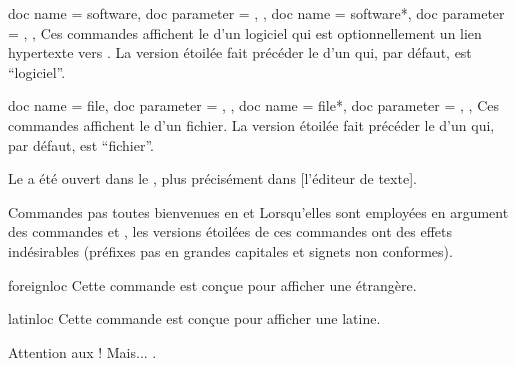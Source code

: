 \documentclass{letgut}
\begin{document}
\begin{docCommands}
  {
    {
      doc name = software,
      doc parameter = ,
    },
    {
      doc name = software*,
      doc parameter = ,
    },
  }
  Ces commandes affichent le  d'un logiciel qui est optionnellement un
  lien hypertexte vers .  La version étoilée fait précéder le
   d'un  qui, par défaut, est \enquote{logiciel}.
\end{docCommands}

\begin{docCommands}
  {
    {
      doc name = file,
      doc parameter = ,
    },
    {
      doc name = file*,
      doc parameter = ,
    },
  }
  Ces commandes affichent le  d'un fichier.  La version étoilée fait
  précéder le  d'un  qui, par défaut, est
  \enquote{fichier}.
\end{docCommands}

\begin{ltx-code-result}[title addon=logiciels et fichiers,listing options app={deletekeywords={[3]{file,plus,l,tex}}}]
Le  a été ouvert dans le
, plus
précisément dans [l'éditeur de texte].
\end{ltx-code-result}

\begin{dbwarning}{Commandes pas toutes bienvenues en  et
    }{}
  Lorsqu'elles sont employées en argument des commandes  et
  , les versions étoilées de ces commandes ont des effets
  indésirables (préfixes pas en grandes capitales et signets non conformes).
\end{dbwarning}

\begin{docCommand}{foreignloc}{}
  Cette commande est conçue pour afficher une  étrangère.
\end{docCommand}

\begin{docCommand}{latinloc}{}
  Cette commande est conçue pour afficher une  latine.
\end{docCommand}

\begin{ltx-code-result}[title addon=locutions étrangères,listing options app={deletekeywords={[3]{options}}}]
Attention aux  !
Mais... .
\end{ltx-code-result}
\end{document}
